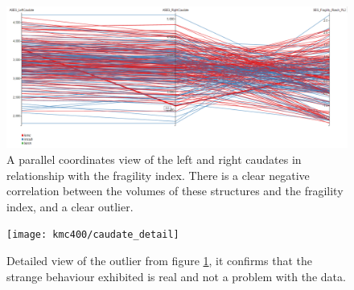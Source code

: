\begin{figure}
	\centering
		\includegraphics[width=\textwidth]{figures/kmc400/caudate_parallel}
	\caption{A parallel coordinates view of the left and right caudates in relationship with the fragility index. There is a clear negative correlation between the volumes of these structures and the fragility index, and a clear outlier.}
	\label{fig_caudate_parallel}
\end{figure}


\begin{figure}
	\centering
		\texttt{[image: kmc400/caudate\_detail]}
	\caption{Detailed view of the outlier from figure \ref{fig_caudate_parallel}, it confirms that the strange behaviour exhibited is real and not a problem with the data.}
	\label{fig_asymetric_caudate_detail}
\end{figure}






